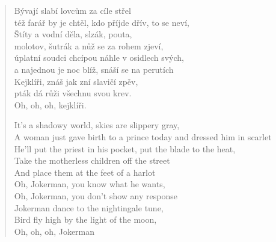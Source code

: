 \begin{verse}
Bývají slabí lovcům za cíle střel\\
též farář by je chtěl, kdo příjde dřív, to se neví, \\
Štíty a vodní děla, slzák, pouta, \\
molotov, šutrák a nůž se za rohem zjeví, \\
úplatní soudci chcípou náhle v osidlech svých, \\
a najednou je noc blíž, snáší se na perutích \\
Kejklíři, znáš jak zní slavičí zpěv,\\
pták dá růži všechnu svou krev. \\
Oh, oh, oh, kejklíři.

It's a shadowy world, skies are slippery gray, \\
A woman just gave birth to a prince today and dressed him in scarlet \\
He'll put the priest in his pocket, put the blade to the heat, \\
Take the motherless children off the street \\
And place them at the feet of a harlot \\
Oh, Jokerman, you know what he wants, \\
Oh, Jokerman, you don't show any response \\
Jokerman dance to the nightingale tune, \\
Bird fly high by the light of the moon, \\
Oh, oh, oh, Jokerman
\end{verse}
